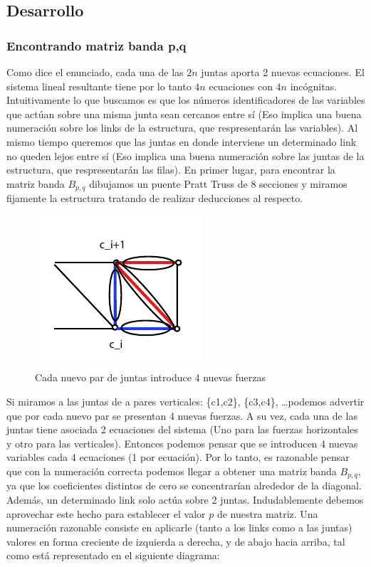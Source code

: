 \subsection{Desarrollo}

\subsubsection{Encontrando matriz banda p,q}

Como dice el enunciado, cada una de las $2n$ juntas aporta 2 nuevas ecuaciones. El sistema lineal resultante tiene por lo tanto $4n$ ecuaciones con $4n$ incógnitas.
Intuitivamente lo que buscamos es que los números identificadores de las variables que actúan sobre una misma junta sean cercanos entre sí (Eso implica una buena numeración sobre los links de la estructura,
que respresentarán las variables).
Al mismo tiempo queremos que las juntas en donde interviene un determinado link no queden lejos entre sí (Eso implica una buena numeración sobre las juntas de la estructura, que respresentarán las filas).
En primer lugar, para encontrar la matriz banda $B_{p,q}$ dibujamos un puente Pratt Truss de 8 secciones y miramos fijamente la estructura tratando de realizar deducciones al respecto.

\begin{figure}[!h]
	\begin{center}
		  \includegraphics[keepaspectratio]{Imagenes/im_3.pdf}
		  \caption{Cada nuevo par de juntas introduce 4 nuevas fuerzas}
		  \label{fig:contra1}
	\end{center}
\end{figure}
\FloatBarrier

Si miramos a las juntas de a pares verticales: \{c1,c2\}, \{c3,c4\}, \ldots podemos advertir que por cada nuevo par se presentan 4 nuevas fuerzas. A su vez, cada una de las juntas tiene asociada 2 ecuaciones
del sistema (Uno para las fuerzas horizontales y otro para las verticales). Entonces podemos pensar que se introducen 4 nuevas variables cada 4 ecuaciones (1 por ecuación). Por lo tanto, es razonable pensar
que con la numeración correcta podemos llegar a obtener una matriz banda $B_{p,q}$, ya que los coeficientes distintos de cero se concentrarían alrededor de la diagonal. Además, un determinado link solo actúa 
sobre 2 juntas. Indudablemente debemos aprovechar este hecho para establecer el valor $p$ de nuestra matriz. Una numeración razonable consiste en aplicarle (tanto a los links como a las juntas) valores en
forma creciente de izquierda a derecha, y de abajo hacia arriba, tal como está representado en el siguiente diagrama:

